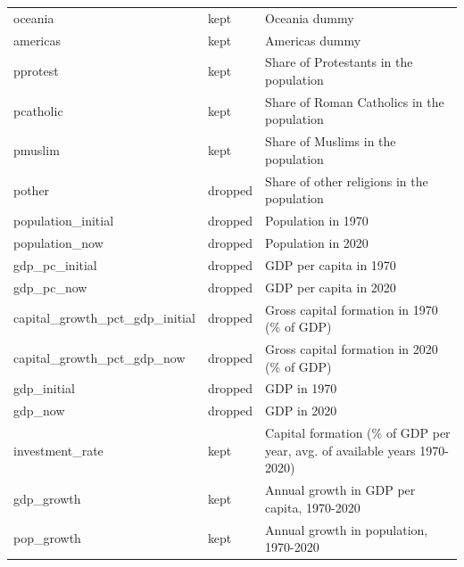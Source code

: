 \begin{tabular}{lll}
 oceania                        & kept     & Oceania dummy                                                            \\
 americas                       & kept     & Americas dummy                                                           \\
 pprotest                       & kept     & Share of Protestants in the population                                   \\
 pcatholic                      & kept     & Share of Roman Catholics in the population                               \\
 pmuslim                        & kept     & Share of Muslims in the population                                       \\
 pother                         & dropped  & Share of other religions in the population                               \\
 population\_initial             & dropped  & Population in 1970                                                       \\
 population\_now                 & dropped  & Population in 2020                                                       \\
 gdp\_pc\_initial                 & dropped  & GDP per capita in 1970                                                   \\
 gdp\_pc\_now                     & dropped  & GDP per capita in 2020                                                   \\
 capital\_growth\_pct\_gdp\_initial & dropped  & Gross capital formation in 1970 (\% of GDP)                               \\
 capital\_growth\_pct\_gdp\_now     & dropped  & Gross capital formation in 2020 (\% of GDP)                               \\
 gdp\_initial                    & dropped  & GDP in 1970                                                              \\
 gdp\_now                        & dropped  & GDP in 2020                                                              \\
 investment\_rate                & kept     & Capital formation (\% of GDP per year, avg. of available years 1970-2020) \\
 gdp\_growth                     & kept     & Annual growth in GDP per capita, 1970-2020                               \\
 pop\_growth                     & kept     & Annual growth in population, 1970-2020                                   \\

\end{tabular}
